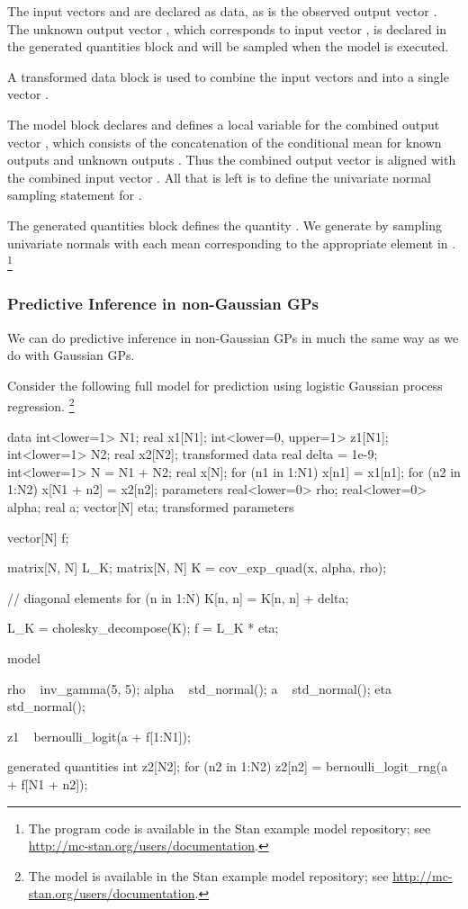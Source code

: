 The input vectors  and  are declared as data, as is the
observed output vector .  The unknown output vector , which
corresponds to input vector , is declared in the generated quantities
block and will be sampled when the model is executed.

A transformed data block is used to combine the input vectors
 and  into a single vector .

The model block declares and defines a local variable for the combined output
vector , which consists of the concatenation of the conditional mean
for known outputs  and unknown outputs .  Thus the
combined output vector  is aligned with the combined
input vector .  All that is left is to define the univariate
normal sampling statement for .

The generated quantities block defines the quantity . We generate
 by sampling  univariate normals with each mean corresponding
to the appropriate element in .
\footnote{The program code is available in the Stan example model repository;
see \url{http://mc-stan.org/users/documentation}.}
%

\subsubsection{Predictive Inference in non-Gaussian GPs}

We can do predictive inference in non-Gaussian GPs in much the
same way as we do with Gaussian GPs.

Consider the following full model for prediction using logistic Gaussian
process regression.
%
\footnote{The model is available in the Stan example model repository;
see \url{http://mc-stan.org/users/documentation}.}
%
%
\begin{stancode}
data {
  int<lower=1> N1;
  real x1[N1];
  int<lower=0, upper=1> z1[N1];
  int<lower=1> N2;
  real x2[N2];
}
transformed data {
  real delta = 1e-9;
  int<lower=1> N = N1 + N2;
  real x[N];
  for (n1 in 1:N1) x[n1] = x1[n1];
  for (n2 in 1:N2) x[N1 + n2] = x2[n2];
}
parameters {
  real<lower=0> rho;
  real<lower=0> alpha;
  real a;
  vector[N] eta;
}
transformed parameters {
  vector[N] f;
  {
    matrix[N, N] L_K;
    matrix[N, N] K = cov_exp_quad(x, alpha, rho);

    // diagonal elements
    for (n in 1:N)
      K[n, n] = K[n, n] + delta;

    L_K = cholesky_decompose(K);
    f = L_K * eta;
  }
}
model {
  rho ~ inv_gamma(5, 5);
  alpha ~ std_normal();
  a ~ std_normal();
  eta ~ std_normal();

  z1 ~ bernoulli_logit(a + f[1:N1]);
}
generated quantities {
  int z2[N2];
  for (n2 in 1:N2)
    z2[n2] = bernoulli_logit_rng(a + f[N1 + n2]);
}
\end{stancode}
%

